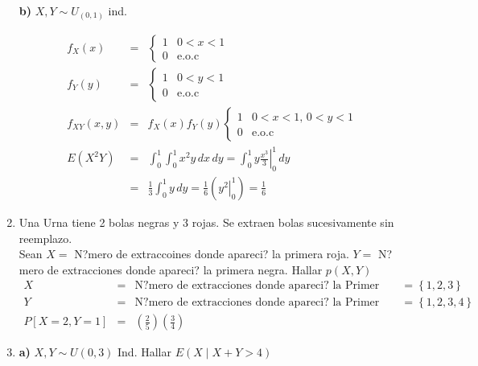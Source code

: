 \begin{enumerate}
 \textbf{b)} $X, Y \sim U_{ \left(0,1 \right) }$ ind.
 
 \begin{eqnarray*}
 f_{X} \left(x \right) &=&
 \begin{cases}
 1 & 0<x<1 \\
 0 & \textrm{e.o.c}
 \end{cases}\\ 
  f_{Y} \left(y \right) &=&
 \begin{cases}
 1 & 0<y<1 \\
 0 & \textrm{e.o.c}
 \end{cases}\\ 
 f_{XY} \left(x,y \right)&=& f_{X} \left(x \right)f_{Y} \left(y \right)
 \begin{cases}
1 & 0<x<1 , \, 0<y<1 \\
 0 & \textrm{e.o.c}
 \end{cases}\\
 E \left(X^{2} Y \right)&=& \int_{0}^{1}\int_{0}^{1} x^{2} y \, dx \, dy = \left.\int_{0}^{1} y \frac{x^3}{3} \right|_{0}^{1} \, dy\\ &=&\frac{1}{3} \int_{0}^{1} y \, dy = \frac{1}{6} \left(\left.y^{2} \right|_{0}^{1}\right) = \frac{1}{6}
 \end{eqnarray*}
 \item Una Urna tiene 2 bolas negras y 3 rojas. Se extraen bolas sucesivamente sin reemplazo. \\
 Sean $X = $ N?mero de extraccoines donde apareci? la primera roja. 
 $Y=$ N?mero de extracciones donde apareci? la primera negra. 
 Hallar $p \left(X,Y \right)$
\begin{eqnarray*}
X &=& \textrm{N?mero de extracciones donde apareci? la Primer bola roja.}= \left\{1,2,3 \right\}\\
Y &=& \textrm{N?mero de extracciones donde apareci? la Primer bola negra.}= \left\{1,2,3,4 \right\}\\
P \left[X=2, Y=1 \right] &=& \left(\frac{2}{5}\right) \left(\frac{3}{4}\right)
\end{eqnarray*}  

\item 
\textbf{a)}  $X,Y \sim U \left(0,3 \right)$ Ind. Hallar $E \left(X \mid X+Y > 4 \right)$


\end{enumerate}

